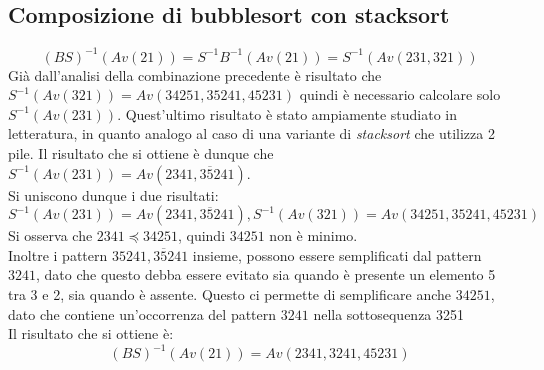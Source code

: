 \subsection*{Composizione di {bubblesort} con {stacksort}}
$$(BS)^{-1}(Av(21))=S^{-1}B^{-1}(Av(21))=S^{-1}(Av(231,321))$$
Gi\`a dall'analisi della combinazione precedente \`e risultato che $S^{-1}(Av(321))=Av(34251, 35241, 45231)$ quindi \`e necessario calcolare solo $S^{-1}(Av(231))$. Quest'ultimo risultato \`e stato ampiamente studiato in letteratura, in quanto analogo al caso di una variante di \textit{stacksort} che utilizza 2 pile. Il risultato che si ottiene \`e dunque che $S^{-1}(Av(231))=Av(2341, 3\overline{5}241)$\cite{claesson2012sorting}.\\
Si uniscono dunque i due risultati:
$$S^{-1}(Av(231))=Av(2341,3\overline{5}241), S^{-1}(Av(321))=Av(34251, 35241, 45231)$$
Si osserva che $2341\preceq 34251$, quindi $34251$ non \`e minimo.\\
Inoltre i pattern $35241, 3\overline{5}241$ insieme, possono essere semplificati dal pattern $3241$, dato che questo debba essere evitato sia quando \`e presente un elemento 5 tra 3 e 2, sia quando \`e assente. Questo ci permette di semplificare anche $34251$, dato che contiene un'occorrenza del pattern $3241$ nella sottosequenza 3251\\
Il risultato che si ottiene \`e:
$$(BS)^{-1}(Av(21))=Av(2341,3241,45231)$$
